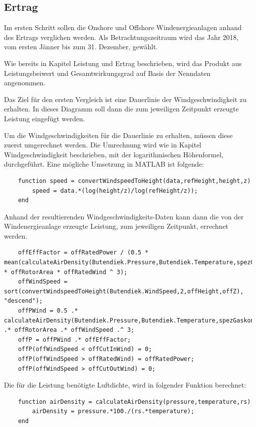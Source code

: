 \documentclass[a4paper,12pt]{article}
\begin{document}
	\subsection{Ertrag}
	Im ersten Schritt sollen die Onshore und Offshore Windenergieanlagen anhand des Ertrags verglichen werden. Als Betrachtungszeitraum wird das Jahr 2018, vom ersten Jänner bis zum 31. Dezember, gewählt.\\ \par
	\noindent Wie bereits in Kapitel Leistung und Ertrag beschrieben, wird das Produkt aus Leistungsbeiwert und Gesamtwirkungsgrad auf Basis der Nenndaten angenommen.\\ \par
	\noindent Das Ziel für den ersten Vergleich ist eine Dauerlinie der Windgeschwindigkeit zu erhalten. In dieses Diagramm soll dann die zum jeweiligen Zeitpunkt erzeugte Leistung eingefügt werden.\\ \par
	\noindent Um die Windgeschwindigkeiten für die Dauerlinie zu erhalten, müssen diese zuerst umgerechnet werden. Die Umrechnung wird wie in Kapitel Windgeschwindigkeit beschrieben, mit der logarithmischen Höhenformel, durchgeführt.\newline
	Eine mögliche Umsetzung in MATLAB ist folgende:
	\begin{lstlisting}
	function speed = convertWindspeedToHeight(data,refHeight,height,z)
		speed = data.*(log(height/z)/log(refHeight/z));
	end
	\end{lstlisting}
	Anhand der resultierenden Windgeschwindigkeits-Daten kann dann die von der Windenergieanlage erzeugte Leistung, zum jeweiligen Zeitpunkt, errechnet werden.
	\begin{lstlisting}
	offEffFactor = offRatedPower / (0.5 * mean(calculateAirDensity(Butendiek.Pressure,Butendiek.Temperature,spezGaskonst)) * offRotorArea * offRatedWind ^ 3);
	offWindSpeed = sort(convertWindspeedToHeight(Butendiek.WindSpeed,2,offHeight,offZ), "descend");
	offPWind = 0.5 .* calculateAirDensity(Butendiek.Pressure,Butendiek.Temperature,spezGaskonst) .* offRotorArea .* offWindSpeed .^ 3;
	offP = offPWind .* offEffFactor;
	offP(offWindSpeed < offCutInWind) = 0;
	offP(offWindSpeed > offRatedWind) = offRatedPower;
	offP(offWindSpeed > offCutOutWind) = 0;
	\end{lstlisting}
	Die für die Leistung benötigte Luftdichte, wird in folgender Funktion berechnet:
	\begin{lstlisting}
	function airDensity = calculateAirDensity(pressure,temperature,rs)
		airDensity = pressure.*100./(rs.*temperature);
	end
	\end{lstlisting}
\end{document}
